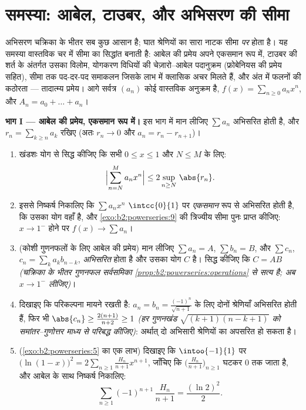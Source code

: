 \section{समस्या: आबेल, टाउबर, और अभिसरण की सीमा}

\begin{problem}\label{pb:b2:powerseries:1}
अभिसरण चक्रिका के भीतर सब कुछ आसान है; घात श्रेणियों का सारा नाटक सीमा
\emph{पर} होता है। यह समस्या वास्तविक चर में सीमा का सिद्धांत बनाती है:
आबेल की प्रमेय अपने एकसमान रूप में, टाउबर की शर्त के अंतर्गत उसका विलोम,
योगकरण विधियों की चेज़ारो--आबेल पदानुक्रम (फ्रोबेनियस की प्रमेय सहित),
सीमा तक पद-दर-पद समाकलन जिसके लाभ में क्लासिक अचर मिलते हैं, और अंत में
 फलनों की कठोरता --- तादात्म्य प्रमेय। आगे सर्वत्र $(a_n)$ कोई वास्तविक अनुक्रम है,
$f(x) = \sum_{n\geq0}
a_nx^n$, और $A_n = a_0 + \dots + a_n$।

\medskip
\noindent\textbf{भाग I --- आबेल की प्रमेय, एकसमान रूप में।} इस भाग में
मान लीजिए $\sum a_n$ अभिसरित होती है, और $r_n =
\sum_{k\geq n} a_k$ रखिए (अतः $r_n \to 0$ और $a_n = r_n -
r_{n+1}$)।
\begin{enumerate}
  \item खंडशः योग से सिद्ध कीजिए कि सभी $0 \leq x
        \leq 1$ और $N \leq M$ के लिए:
        \[
        \Bigl|\sum_{n=N}^{M} a_n x^n\Bigr|
        \leq 2\sup_{n \geq N}\,\abs{r_n} .
        \]
  \item इससे निष्कर्ष निकालिए कि $\sum a_nx^n$ $\intcc{0}{1}$ पर \emph{एकसमान} रूप से
        अभिसरित होती है, कि उसका योग वहाँ  है, और \cref{exo:b2:powerseries:9} की त्रिज्यीय
        सीमा पुनः प्राप्त कीजिए: $x
        \to 1^-$ होने पर $f(x) \to \sum a_n$।
  \item (कोशी गुणनफलों के लिए आबेल की प्रमेय) मान लीजिए $\sum a_n = A$, $\sum b_n = B$, और
         $\sum
        c_n$, $c_n = \sum_{k} a_kb_{n-k}$, \emph{अभिसरित} होता है और उसका योग $C$
        है। सिद्ध कीजिए कि $C = AB$ \emph{(चक्रिका के भीतर गुणनफल सर्वसमिका
        \cref{prop:b2:powerseries:operations} से सत्य है; अब $x \to
        1^-$ लीजिए)}।
  \item दिखाइए कि परिकल्पना मायने रखती है: $a_n = b_n =
        \frac{(-1)^n}{\sqrt{n+1}}$ के लिए दोनों श्रेणियाँ
        अभिसरित होती हैं, फिर भी $\abs{c_n} \geq \frac{2(n+1)}{n+2} \geq 1$ \emph{(हर गुणनखंड $\sqrt{(k+1)(n-k+1)}$ को
        समांतर--गुणोत्तर माध्य से परिबद्ध कीजिए)}: अर्थात् दो अभिसारी
        श्रेणियों का  अपसरित हो सकता है।
  \item (\cref{exo:b2:powerseries:5} का एक लाभ) दिखाइए कि $\intoo{-1}{1}$ पर $\bigl(\ln(1-x)\bigr)^2 = 2\sum_{n\geq1}
        \frac{H_n}{n+1}x^{n+1}$, जाँचिए कि $\bigl(\frac{H_n}{n+1}\bigr)_{n\geq1}$ घटकर
        $0$ तक जाता है, और आबेल के साथ निष्कर्ष निकालिए:
        \[
        \sum_{n\geq1} (-1)^{n+1}\,\frac{H_n}{n+1}
        = \frac{(\ln 2)^2}{2} .
        \]
\end{enumerate}


\end{problem}
